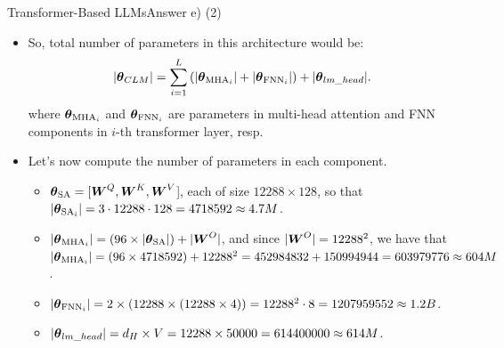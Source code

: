 \documentclass[t]{beamer}
\newcommand\op[1]{\operatorname{#1}}
\begin{document}
\begin{frame}{Transformer-Based LLMs}{Answer e) (2)}
    \begin{itemize}
        \item So, total number of parameters in this architecture would
              be:
              \begin{align}
                  |\vtheta_{CLM}| = \sum_{i=1}^{L} \left(|\vtheta_{\op{MHA}_i}| + |\vtheta_{\op{FNN}_i}|\right) + |\vtheta_{lm\_head}|.
              \end{align}
              where $\vtheta_{\op{MHA}_i}$ and $\vtheta_{\op{FNN}_i}$ are
              parameters in multi-head attention and FNN components in $i$-th
              transformer layer, resp.
        \item Let's now compute the number of parameters in each component.
              \begin{itemize}
                  \item $\vtheta_{\op{SA}} = [\mW^Q,\mW^K,\mW^V$], each of size
                        $12288\times 128$, so that
                        $|\vtheta_{\op{SA}_i}| = 3\cdot 12288\cdot 128 = 4718592 \approx 4.7M$.
                  \item $|\vtheta_{\op{MHA}_i}| = (96\times |\vtheta_{\op{SA}}|) + |\mW^O|$,
                        and since $|{\boldsymbol{W}}^O| = 12288^2$, we have that
                        $|\vtheta_{\op{MHA}_i}| = (96\times 4718592) + 12288^2 = 452984832 + 150994944 = 603979776 \approx 604M$.
                  \item $|\vtheta_{\op{FNN}_i}| = 2\times \left(12288\times (12288\times 4)\right) = 12288^2\cdot 8 = 1207959552 \approx 1.2B$.
                  \item $|{\boldsymbol{\theta}}_{lm\_head}| = d_H \times V = 12288 \times 50000 = 614400000 \approx 614M$.
              \end{itemize}
    \end{itemize}
\end{frame}
\end{document}
